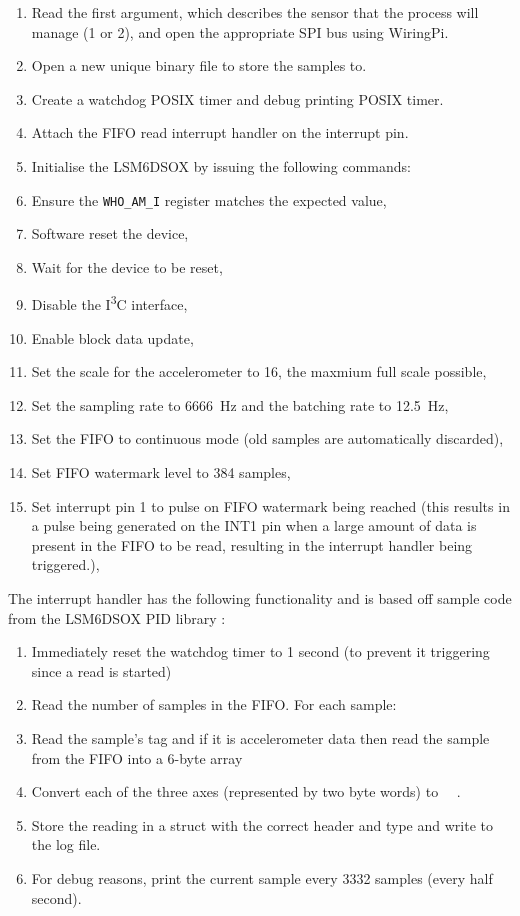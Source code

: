 \documentclass[a4paper,11pt]{article}
\begin{document}
\begin{enumerate}
  \item Read the first argument, which describes the sensor that the process will manage (1 or 2), and open the appropriate SPI bus using WiringPi.
  \item Open a new unique binary file to store the samples to.
  \item Create a watchdog POSIX timer and debug printing POSIX timer.
  \item Attach the FIFO read interrupt handler on the interrupt pin.
  \item Initialise the LSM6DSOX by issuing the following commands:
  \item Ensure the \texttt{WHO\_AM\_I} register matches the expected value,
  \item Software reset the device,
  \item Wait for the device to be reset,
  \item Disable the I\textsuperscript{3}C interface,
  \item Enable block data update,
  \item Set the scale for the accelerometer to \SI{16}{\gacc}, the maxmium full scale possible,
  \item Set the sampling rate to \SI{6666}{\hertz} and the batching rate to \SI{12.5}{\hertz},
  \item Set the FIFO to continuous mode (old samples are automatically discarded),
  \item Set FIFO watermark level to 384 samples,
  \item Set interrupt pin 1 to pulse on FIFO watermark being reached (this results in a pulse being generated on the INT1 pin when a large amount of data is present in the FIFO to be read, resulting in the interrupt handler being triggered.),
\end{enumerate}

The interrupt handler has the following functionality and is based off sample code from the LSM6DSOX PID library \cite{stmicroelectronics_lsm6dsox_pid}:

\begin{enumerate}
  \item Immediately reset the watchdog timer to 1 second (to prevent it triggering since a read is started)
  \item Read the number of samples in the FIFO. For each sample:
  \item Read the sample's tag and if it is accelerometer data then read the sample from the FIFO into a 6-byte array
  \item Convert each of the three axes (represented by two byte words) to \SI{}{\milli\gacc}.
  \item Store the reading in a struct with the correct header and type and write to the log file.
  \item For debug reasons, print the current sample every 3332 samples (every half second).
\end{enumerate}
\end{document}
